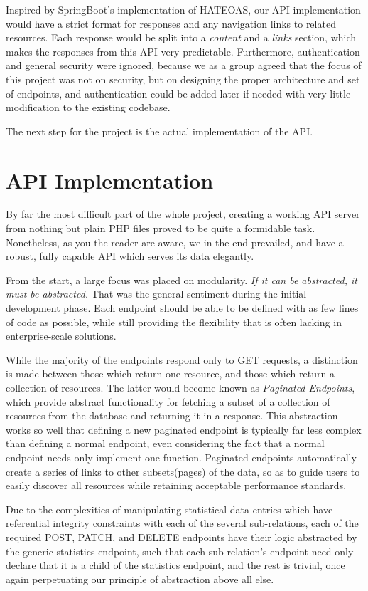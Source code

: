 \documentclass[12pt, a4paper, notitlepage]{report}
\begin{document}
		Inspired by SpringBoot's implementation of HATEOAS, our API implementation would have a strict format for responses and any navigation links to related resources. Each response would be split into a \textit{content} and a \textit{links} section, which makes the responses from this API very predictable. Furthermore, authentication and general security were ignored, because we as a group agreed that the focus of this project was not on security, but on designing the proper architecture and set of endpoints, and authentication could be added later if needed with very little modification to the existing codebase.
		
		The next step for the project is the actual implementation of the API.
		
	\section*{API Implementation}
		By far the most difficult part of the whole project, creating a working API server from nothing but plain PHP files proved to be quite a formidable task. Nonetheless, as you the reader are aware, we in the end prevailed, and have a robust, fully capable API which serves its data elegantly.
		
		From the start, a large focus was placed on modularity. \textit{If it can be abstracted, it must be abstracted.} That was the general sentiment during the initial development phase. Each endpoint should be able to be defined with as few lines of code as possible, while still providing the flexibility that is often lacking in enterprise-scale solutions.
		
		While the majority of the endpoints respond only to GET requests, a distinction is made between those which return one resource, and those which return a collection of resources. The latter would become known as \textit{Paginated Endpoints}, which provide abstract functionality for fetching a subset of a collection of resources from the database and returning it in a response. This abstraction works so well that defining a new paginated endpoint is typically far less complex than defining a normal endpoint, even considering the fact that a normal endpoint needs only implement one function. Paginated endpoints automatically create a series of links to other subsets(pages) of the data, so as to guide users to easily discover all resources while retaining acceptable performance standards.
		
		Due to the complexities of manipulating statistical data entries which have referential integrity constraints with each of the several sub-relations, each of the required POST, PATCH, and DELETE endpoints have their logic abstracted by the generic statistics endpoint, such that each sub-relation's endpoint need only declare that it is a child of the statistics endpoint, and the rest is trivial, once again perpetuating our principle of abstraction above all else.
		
\end{document}
